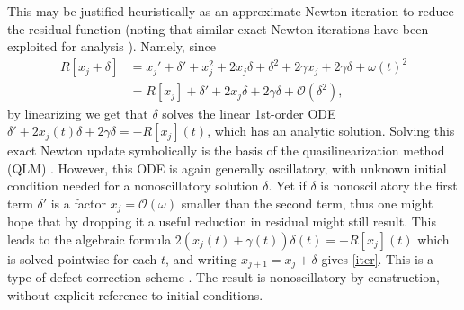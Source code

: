 \documentclass[10pt]{article}
\newcommand{\bigO}{{\mathcal O}}
\newcommand{\om}{\omega}
\newcommand{\g}{\gamma}
\newcommand{\Fruzsi}[1]{{\color{blue}#1}}
\begin{document}
This may be justified heuristically as an approximate Newton
iteration to reduce the residual function
(noting that similar exact Newton iterations have been
exploited for analysis \cite{heitman2015}).
Namely, since
\begin{align}
    R[x_j + \delta] &= x_j' + \delta' + x_j^2 + 2 x_j \delta + \delta^2 
    + 2\g x_j + 2\g\delta + \om(t)^2 \nonumber \\
    &= R[x_j] + \delta' + 2x_j\delta + 2\g\delta + \bigO(\delta^2), \nonumber
\end{align}
by linearizing we get that $\delta$ solves the linear 1st-order ODE
$\delta' + 2x_j(t) \delta + 2\g \delta  = -R[x_j](t)$,
which has an analytic solution.
Solving this exact Newton update symbolically is the basis of the quasilinearization method (QLM) \cite{bellman1970}.
However, this ODE is again generally oscillatory,
with unknown initial condition needed for a nonoscillatory solution $\delta$.
Yet if $\delta$ is nonoscillatory the first term $\delta'$ is
a factor $x_j = \bigO(\om)$ smaller than the second term, thus
one might hope that by dropping it a useful reduction in residual might
still result.
This leads to the algebraic formula $2\left(x_j(t) + \g(t)\right) \delta(t) = -R[x_j](t)$
which is solved pointwise for each $t$, and
writing $x_{j+1} = x_j + \delta$ gives \cref{iter}.
This is a type of defect correction scheme \cite{bohmer1984}.
The result is nonoscillatory by construction, without explicit reference
to initial conditions.
\end{document}
